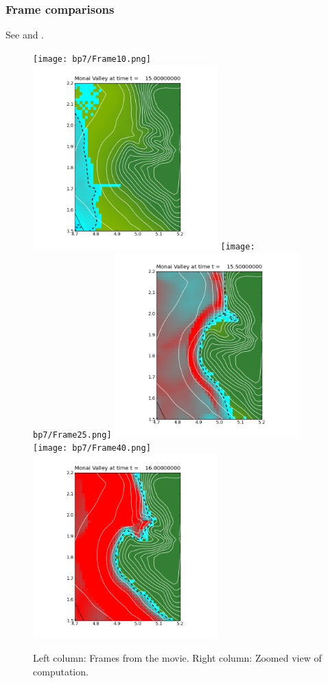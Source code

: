 \subsubsection{Frame comparisons}

See  and .

\begin{figure}[ht]
\hfil\texttt{[image: bp7/Frame10.png]}\hfil
\hfil\includegraphics[width=2.8in]{bp7/figs423/frame0005fig10.png}\hfil
\vskip 5pt
\hfil\texttt{[image: bp7/Frame25.png]}\hfil
\hfil\includegraphics[width=2.8in]{bp7/figs423/frame0007fig10.png}\hfil
\vskip 5pt
\hfil\texttt{[image: bp7/Frame40.png]}\hfil
\hfil\includegraphics[width=2.8in]{bp7/figs423/frame0009fig10.png}\hfil
\caption{\label{fig:bp7framesA} 
Left column: Frames from the movie.
Right column: Zoomed view of computation.
  }
\end{figure}


